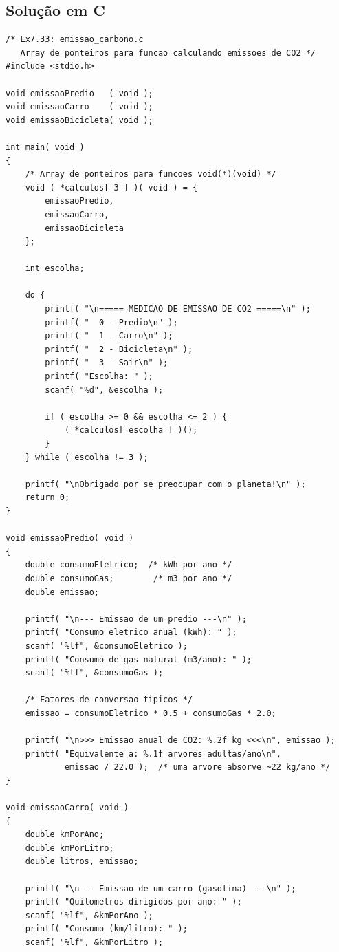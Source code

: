 \documentclass[12pt,a4paper]{article}
\begin{document}
\subsection*{Solução em C}

\begin{respostabox}
\begin{lstlisting}
/* Ex7.33: emissao_carbono.c
   Array de ponteiros para funcao calculando emissoes de CO2 */
#include <stdio.h>

void emissaoPredio   ( void );
void emissaoCarro    ( void );
void emissaoBicicleta( void );

int main( void )
{
    /* Array de ponteiros para funcoes void(*)(void) */
    void ( *calculos[ 3 ] )( void ) = {
        emissaoPredio,
        emissaoCarro,
        emissaoBicicleta
    };

    int escolha;

    do {
        printf( "\n===== MEDICAO DE EMISSAO DE CO2 =====\n" );
        printf( "  0 - Predio\n" );
        printf( "  1 - Carro\n" );
        printf( "  2 - Bicicleta\n" );
        printf( "  3 - Sair\n" );
        printf( "Escolha: " );
        scanf( "%d", &escolha );

        if ( escolha >= 0 && escolha <= 2 ) {
            ( *calculos[ escolha ] )();
        }
    } while ( escolha != 3 );

    printf( "\nObrigado por se preocupar com o planeta!\n" );
    return 0;
}

void emissaoPredio( void )
{
    double consumoEletrico;  /* kWh por ano */
    double consumoGas;        /* m3 por ano */
    double emissao;

    printf( "\n--- Emissao de um predio ---\n" );
    printf( "Consumo eletrico anual (kWh): " );
    scanf( "%lf", &consumoEletrico );
    printf( "Consumo de gas natural (m3/ano): " );
    scanf( "%lf", &consumoGas );

    /* Fatores de conversao tipicos */
    emissao = consumoEletrico * 0.5 + consumoGas * 2.0;

    printf( "\n>>> Emissao anual de CO2: %.2f kg <<<\n", emissao );
    printf( "Equivalente a: %.1f arvores adultas/ano\n",
            emissao / 22.0 );  /* uma arvore absorve ~22 kg/ano */
}

void emissaoCarro( void )
{
    double kmPorAno;
    double kmPorLitro;
    double litros, emissao;

    printf( "\n--- Emissao de um carro (gasolina) ---\n" );
    printf( "Quilometros dirigidos por ano: " );
    scanf( "%lf", &kmPorAno );
    printf( "Consumo (km/litro): " );
    scanf( "%lf", &kmPorLitro );


\end{lstlisting}
\end{respostabox}
\end{document}
